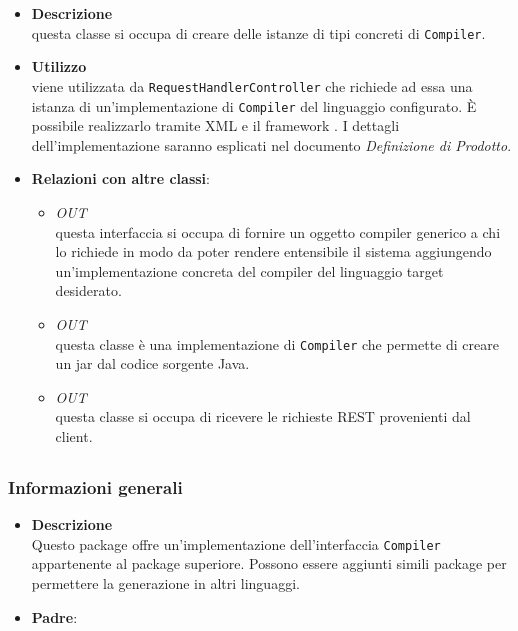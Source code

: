 \label{\nogloxy{swedesigner::server::compiler::CompilerAssembler}}
\begin{itemize}
\item \textbf{Descrizione}\\
questa classe si occupa di creare delle istanze di tipi concreti di \texttt{Compiler}. 
\item \textbf{Utilizzo}\\
viene utilizzata da \texttt{RequestHandlerController} che richiede ad essa una istanza di un'implementazione di \texttt{Compiler} del linguaggio configurato. È possibile realizzarlo tramite XML e il framework \spring{}. I dettagli dell'implementazione saranno esplicati nel documento \emph{Definizione di Prodotto}. %
\item \textbf{Relazioni con altre classi}:
\begin{itemize}
\item \textit{OUT} \hyperref[\nogloxy{swedesigner::server::compiler::Compiler}]{}\\
questa interfaccia si occupa di fornire un oggetto compiler generico a chi lo richiede in modo da poter rendere entensibile il sistema aggiungendo un'implementazione concreta del compiler del linguaggio target desiderato.
\item \textit{OUT} \hyperref[\nogloxy{swedesigner::server::compiler::java::JavaCompiler}]{}\\
questa classe è una implementazione di \texttt{Compiler} che permette di creare un jar dal codice sorgente Java.
\item \textit{OUT} \hyperref[\nogloxy{swedesigner::server::controller::RequestHandlerController}]{}\\
questa classe si occupa di ricevere le richieste REST provenienti dal client.
\end{itemize}
\end{itemize}
\subsection{}
\label{\nogloxy{swedesigner::server::compiler::java}}
\subsubsection{Informazioni generali}
\begin{itemize}
\item \textbf{Descrizione}\\
Questo package offre un'implementazione dell'interfaccia \texttt{Compiler} appartenente al package superiore. Possono essere aggiunti simili package per permettere la generazione in altri linguaggi.
\item \textbf{Padre}: \hyperref[\nogloxy{swedesigner::server::compiler}]{}
\end{itemize}
